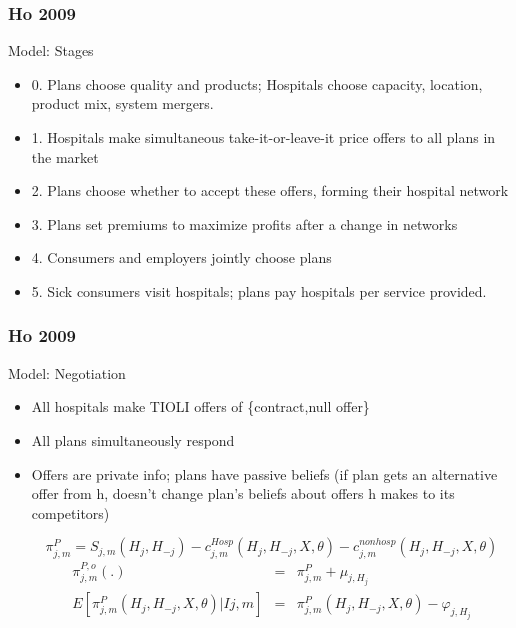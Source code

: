 \documentclass[notes=show]{beamer}
\begin{document}
\begin{frame}
\frametitle{Ho 2009}

Model: Stages
\begin{itemize}
\item 0. Plans choose quality and products; Hospitals choose capacity, location, product mix, system mergers.
\item 1. Hospitals make simultaneous take-it-or-leave-it price offers to all plans in the market
\item 2. Plans choose whether to accept these offers, forming their hospital network
\item 3. Plans set premiums to maximize profits after a change in networks
\item 4. Consumers and employers jointly choose plans
\item 5. Sick consumers visit hospitals; plans pay hospitals per service provided.
\end{itemize}
\end{frame}

\begin{frame}
\frametitle{Ho 2009}

Model: Negotiation
\begin{itemize}
\item All hospitals make TIOLI offers of \{contract,null offer\}
\item All plans simultaneously respond
\item Offers are private info; plans have passive beliefs (if plan gets an alternative offer from h, doesn't change plan's beliefs about offers h makes to its competitors)

\[
\pi _{j,m}^{P} =S_{j,m}(H_{j},H_{-j})-c_{j,m}^{Hosp}(H_{j},H_{-j},X,\theta
)-c_{j,m}^{nonhosp}(H_{j},H_{-j},X,\theta )
\]
\begin{eqnarray*}
\pi _{j,m}^{P,o}(.) &=&\pi _{j,m}^{P}+\mu _{j,H_{j}} \\
E[\pi _{j,m}^{P}(H_{j},H_{-j},X,\theta )|Ij,m] &=&\pi
_{j,m}^{P}(H_{j},H_{-j},X,\theta )-\varphi _{j,H_{j}}
\end{eqnarray*}

\end{itemize}

\end{frame}
\end{document}
